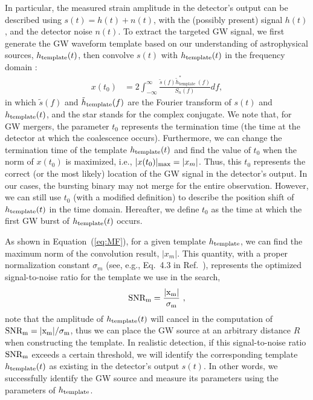 \documentclass[%
 reprint,
 amsmath,amssymb,
 aps,
]{revtex4-2}
\begin{document}
In particular, the measured strain amplitude in the detector's output can be described using 
$s(t) = h(t)+ n(t)$, with the (possibly present) signal $h(t)$, and the detector noise $n(t)$. To extract the targeted GW signal, we first generate the GW waveform template based on our understanding of astrophysical sources, $h_{\rm template}(t)$, then convolve $s(t)$ with $h_{\rm template}(t)$ in the frequency domain \citep[see, e.g.,  Eq.4.1 in][]{Allen2011}:
\begin{equation}
\begin{aligned}
x\left(t_0\right) & =2 \int_{-\infty}^{\infty} \frac{\tilde{s}(f) \tilde{h}_{\text {template }}^*(f)}{S_n(f)} d f,\label{eq:MF}
\end{aligned}
\end{equation}
in which $\tilde{s}(f)$ and $\tilde{h}_{\rm template }(f)$ are the Fourier transform of $s(t)$ and $h_{\rm template}(t)$, and the star stands for the complex conjugate. We note that, for GW mergers, the parameter $t_0$ represents the termination time (the time at the detector at which the coalescence occurs). Furthermore, we can change the termination time of the template $h_{\rm template}(t)$ and find the value of $t_0$ when the norm of $x(t_0)$ is maximized, i.e., $|x(t_0)|_{\rm max}=|x_m|$. Thus, this $t_0$ represents the correct (or the most likely) location of the GW signal in the detector's output. In our cases, the bursting binary may not merge for the entire observation. However, we can still use $t_0$ (with a modified definition) to describe the position shift of $h_{\rm template}(t)$ in the time domain. Hereafter, we define $t_0$ as the time at which the first GW burst of $h_{\rm template}(t)$ occurs.

As shown in Equation~(\ref{eq:MF}), for a given template $h_{\rm template}$, we can find the maximum norm of the convolution result, $|x_m|$. This quantity, with a proper normalization constant $\sigma_m$ (see, e.g., Eq.~4.3 in Ref.~\citep{Allen2011}), represents the optimized signal-to-noise ratio for the template we use in the search, \begin{equation}\label{eq:SNRm}
    \rm SNR_{m}=\frac{|x_m|}{\sigma_m} \ ,
\end{equation} 
note that the amplitude of $h_{\rm template}(t)$ will cancel in the computation of $\rm SNR_{m}=|x_m|/\sigma_m$, thus we can place the GW source at an arbitrary distance $R$ when constructing the template. In realistic detection, if this signal-to-noise ratio $\rm SNR_{m}$ exceeds a certain threshold, we will identify the corresponding template $h_{\rm template}(t)$ as existing in the detector's output $s(t)$. In other words, we successfully identify the GW source and measure its parameters using the parameters of $h_{\rm template}$. 
\end{document}
